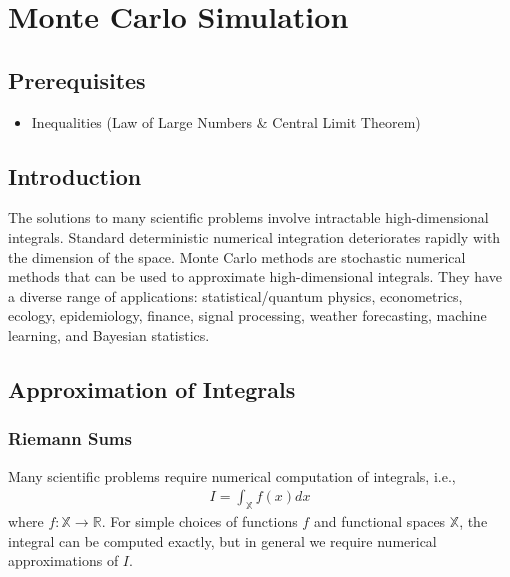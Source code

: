 


\maketitle
\clearpage

\section{Monte Carlo Simulation}

\subsection{Prerequisites}

\begin{itemize}
\item
Inequalities (Law of Large Numbers \& Central Limit Theorem)
\end{itemize}

\subsection{Introduction}

The solutions to many scientific problems involve intractable
high-dimensional integrals. 
Standard deterministic numerical integration
deteriorates rapidly with the dimension of the space. 
Monte Carlo methods are stochastic numerical methods that 
can be used to approximate high-dimensional integrals. 
They have a diverse range of applications:
statistical/quantum physics, econometrics, ecology, epidemiology,
finance, signal processing, weather forecasting, machine learning, and
Bayesian statistics.

\subsection{Approximation of Integrals}

\subsubsection{Riemann Sums}
Many scientific problems require numerical computation of
integrals, i.e.,
\begin{align}
I = \int_{\mathbb{X}}^{}{f(x)}dx
\end{align}
where \(f:\mathbb{X} \rightarrow \mathbb{R}\). 
For simple choices of functions \(f\) and functional spaces \(\mathbb{X}\), 
the integral can be computed exactly, 
but in general we require numerical approximations of \(I\).

